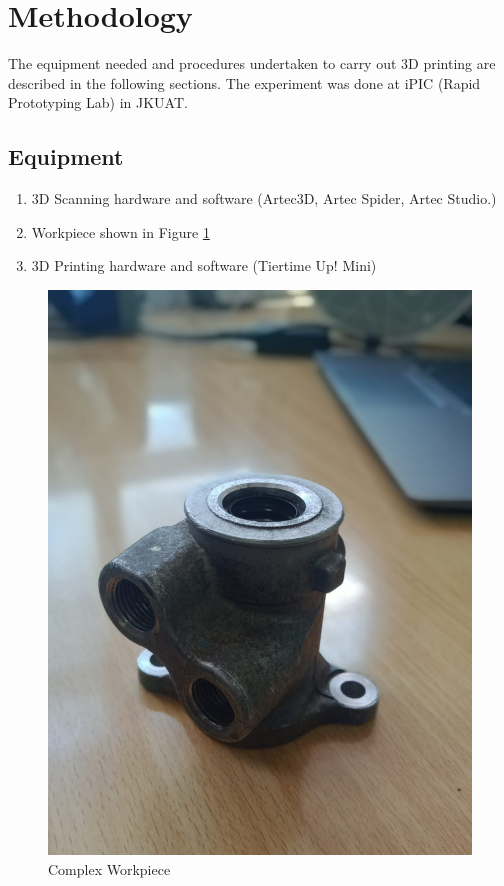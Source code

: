 \section{Methodology}
\lhead{\leftmark}
The equipment needed and procedures undertaken to carry out 3D printing are described in the following sections. The experiment was done at iPIC (Rapid Prototyping Lab) in JKUAT.
\subsection{Equipment}
\begin{enumerate}
\item 3D Scanning hardware and software (Artec3D, Artec Spider, Artec Studio.)
\item Workpiece shown in Figure \ref{fig:3dscan}
\item 3D Printing hardware and software (Tiertime Up! Mini)
\end{enumerate}
\begin{center}
	\begin{figure}[h!]
	\centering
	\includegraphics[width=0.4\linewidth]{Figures/Figure}
	\caption{Complex Workpiece}
	\label{fig:3dscan}
	\end{figure}
\end{center}
\newpage
